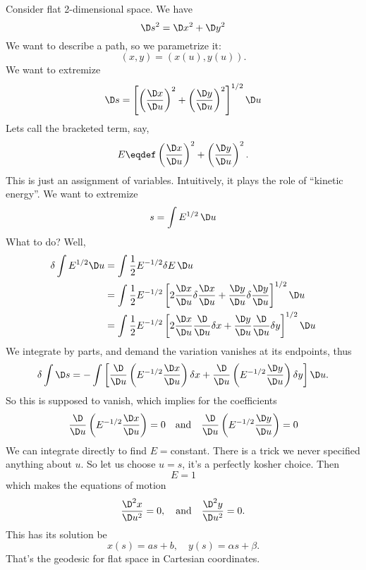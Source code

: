 \begin{ex}[Flat $\RR^2$]
Consider flat 2-dimensional space. We have
\begin{equation}
\D s^2=\D x^2+\D y^2
\end{equation}
We want to describe a path, so we parametrize it:
\begin{equation}
(x,y)=(x(u),y(u)).
\end{equation}
We want to extremize
\begin{equation}
\D s=\left[\left(\frac{\D x}{\D u}\right)^{2}+
\left(\frac{\D y}{\D u}\right)^{2}\right]^{1/2}\D u
\end{equation}
Lets call the bracketed term, say,
\begin{equation}
E\eqdef\left(\frac{\D x}{\D u}\right)^{2}+
\left(\frac{\D y}{\D u}\right)^{2}.
\end{equation}
This is just an assignment of variables. Intuitively, it plays
the role of ``kinetic energy''. We want to extremize
\begin{equation}
s=\int E^{1/2}\,\D u
\end{equation}
What to do? Well,
\begin{subequations}
\begin{align}
\delta\int E^{1/2}\D u
&=\int\frac{1}{2}E^{-1/2}\delta E\,\D u\\
&=\int\frac{1}{2}E^{-1/2}\left[2\frac{\D x}{\D u}\delta\frac{\D x}{\D u}+
\frac{\D y}{\D u}\delta\frac{\D y}{\D u}\right]^{1/2}\D u\\
&=\int\frac{1}{2}E^{-1/2}\left[2\frac{\D x}{\D u}\frac{\D }{\D u}\delta x+
\frac{\D y}{\D u}\frac{\D}{\D u}\delta y\right]^{1/2}\D u
\end{align}
\end{subequations}
We integrate by parts, and demand the variation vanishes at its
endpoints, thus
\begin{equation}
\delta\int\D s=-\int\left[
\frac{\D}{\D u}\left(E^{-1/2}\frac{\D x}{\D u}\right)\delta x
+
\frac{\D}{\D u}\left(E^{-1/2}\frac{\D y}{\D u}\right)\delta y
\right]\D u.
\end{equation}
So this is supposed to vanish, which implies for the coefficients
\begin{equation}
\frac{\D}{\D u}\left(E^{-1/2}\frac{\D x}{\D u}\right)=0\quad
\mbox{and}\quad
\frac{\D}{\D u}\left(E^{-1/2}\frac{\D y}{\D u}\right)=0
\end{equation}
We can integrate directly to find $E=$constant. There is a trick
we never specified anything about $u$. So let us choose $u=s$,
it's a perfectly kosher choice. Then
\begin{equation}
E=1
\end{equation}
which makes the equations of motion
\begin{equation}
\frac{\D^2x}{\D u^2}=0,\quad\mbox{and}\quad
\frac{\D^2y}{\D u^2}=0.
\end{equation}
This has its solution be
\begin{equation}
x(s)=as+b,\quad y(s)=\alpha s+\beta.
\end{equation}
That's the geodesic for flat space in Cartesian coordinates.
\end{ex}
